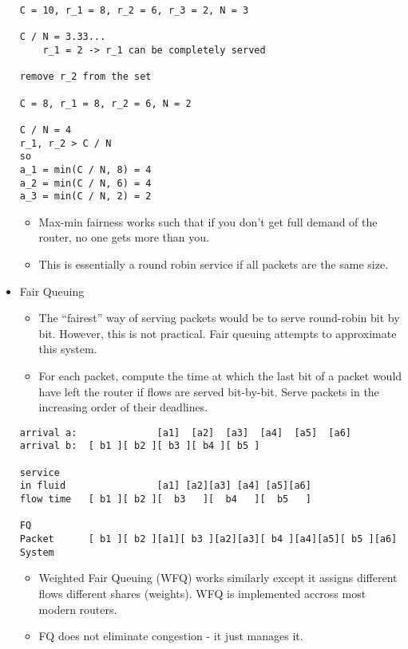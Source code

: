 \begin{itemize}
\begin{verbatim}
C = 10, r_1 = 8, r_2 = 6, r_3 = 2, N = 3

C / N = 3.33...
    r_1 = 2 -> r_1 can be completely served

remove r_2 from the set

C = 8, r_1 = 8, r_2 = 6, N = 2

C / N = 4
r_1, r_2 > C / N
so 
a_1 = min(C / N, 8) = 4
a_2 = min(C / N, 6) = 4
a_3 = min(C / N, 2) = 2
\end{verbatim}

  \begin{itemize}
  \tightlist
  \item
    Max-min fairness works such that if you don't get full demand of the
    router, no one gets more than you.
  \item
    This is essentially a round robin service if all packets are the
    same size.
  \end{itemize}
\item
  Fair Queuing

  \begin{itemize}
  \tightlist
  \item
    The ``fairest'' way of serving packets would be to serve round-robin
    bit by bit. However, this is not practical. Fair queuing attempts to
    approximate this system.
  \item
    For each packet, compute the time at which the last bit of a packet
    would have left the router if flows are served bit-by-bit. Serve
    packets in the increasing order of their deadlines.
  \end{itemize}

\begin{verbatim}
arrival a:              [a1]  [a2]  [a3]  [a4]  [a5]  [a6]
arrival b:  [ b1 ][ b2 ][ b3 ][ b4 ][ b5 ]

service 
in fluid                [a1] [a2][a3] [a4] [a5][a6]
flow time   [ b1 ][ b2 ][  b3   ][  b4   ][  b5   ]

FQ
Packet      [ b1 ][ b2 ][a1][ b3 ][a2][a3][ b4 ][a4][a5][ b5 ][a6]
System
\end{verbatim}

  \begin{itemize}
  \tightlist
  \item
    Weighted Fair Queuing (WFQ) works similarly except it assigns
    different flows different shares (weights). WFQ is implemented
    accross most modern routers.
  \item
    FQ does not eliminate congestion - it just manages it.


\end{itemize}
\end{itemize}

